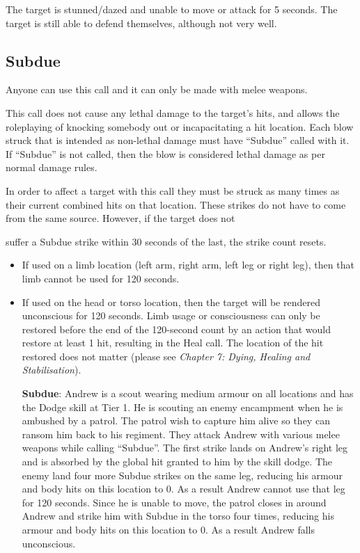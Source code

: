\documentclass{scrbook}
\begin{document}
The target is stunned/dazed and unable to move or attack for 5 seconds. The target is still able to defend themselves, although not very well.

\subsection{Subdue}

Anyone can use this call and it can only be made with melee weapons.

This call does not cause any lethal damage to the target's hits, and allows the roleplaying of knocking somebody out or incapacitating a hit location. Each blow struck that is intended as non-lethal damage must have ``Subdue'' called with it. If ``Subdue'' is not called, then the blow is considered lethal damage as per normal damage rules.

In order to affect a target with this call they must be struck as many times as their current combined hits on that location. These strikes do not have to come from the same source. However, if the target does not

suffer a Subdue strike within 30 seconds of the last, the strike count resets.

\begin{itemize}
\item If used on a limb location (left arm, right arm, left leg or right leg), then that limb cannot be used for 120 seconds.

\item If used on the head or torso location, then the target will be rendered unconscious for 120 seconds. Limb usage or consciousness can only be restored before the end of the 120-second count by an action that would restore at least 1 hit, resulting in the Heal call. The location of the hit restored does not matter (please see \textit{Chapter 7: Dying, Healing and Stabilisation}).

\textbf{Subdue}: Andrew is a scout wearing medium armour on all locations and has the Dodge skill at Tier 1. He is scouting an enemy encampment when he is ambushed by a patrol. The patrol wish to capture him alive so they can ransom him back to his regiment. They attack Andrew with various melee weapons while calling ``Subdue''. The first strike lands on Andrew's right leg and is absorbed by the global hit granted to him by the skill dodge. The enemy land four more Subdue strikes on the same leg, reducing his armour and body hits on this location to 0. As a result Andrew cannot use that leg for 120 seconds. Since he is unable to move, the patrol closes in around Andrew and strike him with Subdue in the torso four times, reducing his armour and body hits on this location to 0. As a result Andrew falls unconscious.

\end{itemize}
\end{document}
